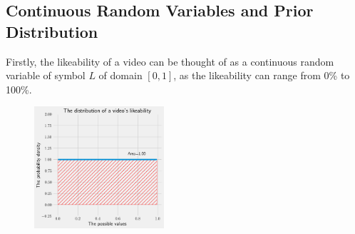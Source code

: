 \documentclass[a4paper,11pt]{article}
\begin{document}
\subsection{Continuous Random Variables and Prior Distribution}
Firstly, the likeability of a video can be thought of as a continuous random variable of symbol $L$ of domain $[0, 1]$, as the likeability can range from 0\% to 100\%.






\begin{figure}
    \includegraphics[width=0.43\textwidth,right]{assets/uniform_pdfs.png}
    \caption{}
    \label{fig:uniform}
\end{figure}
\end{document}
